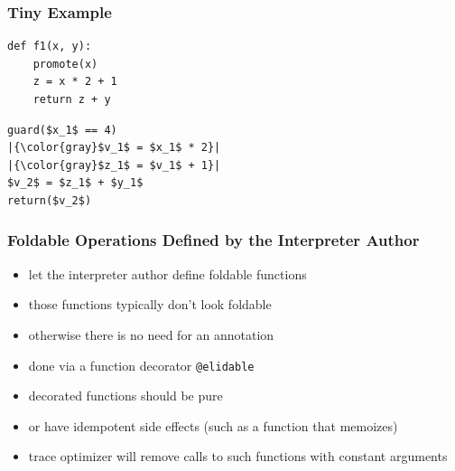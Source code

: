 \documentclass[utf8x]{beamer}
\newcommand{\noop}{}
\begin{document}
\begin{frame}[containsverbatim]
  \frametitle{Tiny Example}
  \begin{minipage}[b]{6cm}
      \centering
      {\noop
      \begin{lstlisting}[mathescape,basicstyle=\ttfamily]
def f1(x, y):
    promote(x)
    z = x * 2 + 1
    return z + y
      \end{lstlisting}
      }
  \end{minipage}
  \vline
  \hspace{0.5cm}
  \begin{minipage}[b]{4cm}
      {\noop
      \begin{lstlisting}[mathescape,escapechar=|,basicstyle=\ttfamily]
guard($x_1$ == 4)
|{\color{gray}$v_1$ = $x_1$ * 2}|
|{\color{gray}$z_1$ = $v_1$ + 1}|
$v_2$ = $z_1$ + $y_1$
return($v_2$)
      \end{lstlisting}
      }
  \end{minipage}
\end{frame}

\begin{frame}
  \frametitle{Foldable Operations Defined by the Interpreter Author}
  \begin{itemize}
      \item let the interpreter author define foldable functions
      \item those functions typically don't look foldable
      \item otherwise there is no need for an annotation
      \item done via a function decorator \texttt{@elidable}
      \pause
      \item decorated functions should be pure
      \item or have idempotent side effects (such as a function that memoizes)
      \item trace optimizer will remove calls to such functions with constant arguments
  \end{itemize}
\end{frame}
\end{document}
